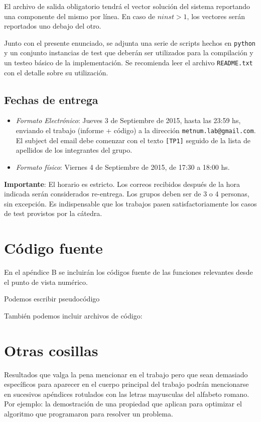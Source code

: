 \documentclass[11pt, a4paper, spanish]{article}
\let\strong\textbf
\begin{document}
\begin{appendices}
      El archivo de salida obligatorio tendrá el vector solución del sistema reportando una componente del mismo por línea. En caso de $ninst > 1$, los vectores serán reportados uno debajo del otro.

      Junto con el presente enunciado, se adjunta una serie de scripts hechos en \texttt{python} y un conjunto instancias de test que deberán ser utilizados para la compilación y un testeo básico de la implementación. Se recomienda leer el archivo \texttt{README.txt} con el detalle sobre su utilización.

    \subsection{Fechas de entrega}
      \begin{itemize}
        \item \emph{Formato Electrónico}: Jueves 3 de Septiembre de 2015, hasta las 23:59 hs, enviando el trabajo (informe + código) a la dirección \texttt{metnum.lab@gmail.com}. El subject del email debe comenzar con el texto \texttt{[TP1]} seguido de la lista de apellidos de los integrantes del grupo.
        \item \emph{Formato físico}: Viernes 4 de Septiembre de 2015, de 17:30 a 18:00 hs.
      \end{itemize}

      \strong{Importante}: El horario es estricto. Los correos recibidos después de la hora indicada serán considerados re-entrega. Los grupos deben ser de 3 o 4 personas, sin excepción. Es indispensable que los trabajos pasen satisfactoriamente los casos de test provistos por la cátedra.

  \newpage
  \section{Código fuente}

    En el apéndice B se incluirán los códigos fuente de las funciones relevantes desde el punto de vista numérico.

    \begin{algorithm}
      \caption{Podemos escribir pseudocódigo}
    \end{algorithm}

    También podemos incluir archivos de código:
    

  \newpage
  \section{Otras cosillas}

    Resultados que valga la pena mencionar en el trabajo pero que sean demasiado específicos para aparecer en el cuerpo principal del trabajo podrán mencionarse en sucesivos apéndices rotulados con las letras mayusculas del alfabeto romano. Por ejemplo: la demostración de una propiedad que aplican para optimizar el algoritmo que programaron para resolver un problema.

\end{appendices}
\end{document}
